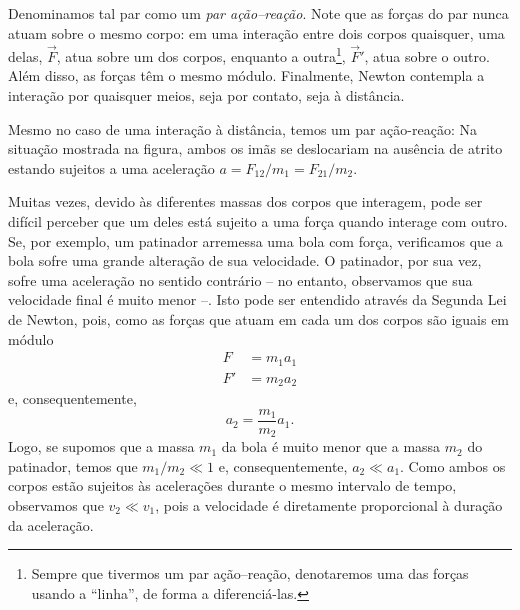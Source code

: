 \noindent{}Denominamos tal par como um \emph{par ação--reação}. Note que as forças do par nunca atuam sobre o mesmo corpo: em uma interação entre dois corpos quaisquer, uma delas, $\vec{F}$, atua sobre um dos corpos, enquanto a outra\footnote{Sempre que tivermos um par ação--reação, denotaremos uma das forças usando a ``linha'', de forma a diferenciá-las.}, $\vec{F}'$, atua sobre o outro. Além disso, as forças têm o mesmo módulo. Finalmente, Newton contempla a interação por quaisquer meios, seja por contato, seja à distância.

\begin{marginfigure}
\centering
{}
\caption{Mesmo no caso de uma interação à distância, temos um par ação-reação: Na situação mostrada na figura, ambos os imãs se deslocariam na ausência de atrito estando sujeitos a uma aceleração $a = F_{12}/m_1 = F_{21}/{m_2}$.}
\end{marginfigure}

Muitas vezes, devido às diferentes massas dos corpos que interagem, pode ser difícil perceber que um deles está sujeito a uma força quando interage com outro. Se, por exemplo, um patinador arremessa uma bola com força, verificamos que a bola sofre uma grande alteração de sua velocidade. O patinador, por sua vez, sofre uma aceleração no sentido contrário -- no entanto, observamos que sua velocidade final é muito menor --. Isto pode ser entendido através da Segunda Lei de Newton, pois, como as forças que atuam  em cada um dos corpos são iguais em módulo
\begin{align}
  F &= m_1 a_1 \\
  F' &= m_2 a_2
\end{align}
%
e, consequentemente,
\begin{equation}
  a_2 = \frac{m_1}{m_2} a_1.
\end{equation}
%
Logo, se supomos que a massa $m_1$ da bola é muito menor que a massa $m_2$ do patinador, temos que $m_1/m_2 \ll 1$ e, consequentemente, $a_2 \ll a_1$. Como ambos os corpos estão sujeitos às acelerações durante o mesmo intervalo de tempo, observamos que $v_2 \ll v_1$, pois a velocidade é diretamente proporcional à duração da aceleração.

